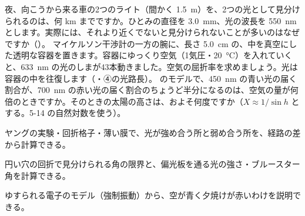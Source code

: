 \bkproblem 夜、向こうから来る車の2つのライト（間かく \qty{1.5}{m}）を、2つの光として見分けられるのは、何 km までですか。ひとみの直径を \qty{3.0}{mm}、光の波長を \qty{550}{nm} とします。実際には、それより近くでないと見分けられないことが多いのはなぜですか（\nobreak{}\nobreak）。
\bkproblem マイケルソン干渉計の一方の腕に、長さ \qty{5.0}{cm} の、中を真空にした透明な容器を置きます。容器にゆっくり空気（1気圧・\qty{20}{\celsius}）を入れていくと、\qty{633}{nm} の光のしまが43本動きました。空気の屈折率を求めましょう。光は容器の中を往復します（\nobreak{}\nobreak・④の光路長）。
\bkproblem {}のモデルで、\qty{450}{nm} の青い光の届く割合が、\qty{700}{nm} の赤い光の届く割合のちょうど半分になるのは、空気の量が何倍のときですか。そのときの太陽の高さは、およそ何度ですか（$X\approx1/\sin h$ とする。5-14 の自然対数を使う）。

\begin{furikaeri}
\begin{checklist}
\item ヤングの実験・回折格子・薄い膜で、光が強め合う所と弱め合う所を、経路の差から計算できる。
\item 円い穴の回折で見分けられる角の限界と、偏光板を通る光の強さ・ブルースター角を計算できる。
\item ゆすられる電子のモデル（強制振動）から、空が青く夕焼けが赤いわけを説明できる。
\end{checklist}
\end{furikaeri}
